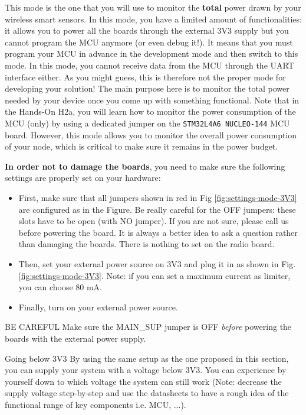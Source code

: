 This mode is the one that you will use to monitor the \textbf{total} power drawn by your wireless smart sensors. In this mode, you have a limited amount of functionalities: it allows you to power all the boards through the external 3V3 supply but you cannot program the MCU anymore (or even debug it!). It means that you must program your MCU in advance in the development mode and then switch to this mode. In this mode, you cannot receive data from the MCU through the UART interface either. As you might guess, this is therefore not the proper mode for developing your solution! The main purpose here is to monitor the total power needed by your device once you come up with something functional. Note that in the Hands-On H2a, you will learn how to monitor the power consumption of the MCU (only) by using a dedicated jumper on the \texttt{STM32L4A6 NUCLEO-144} MCU board. However, this mode allows you to monitor the overall power consumption of your node, which is critical to make sure it remains in the power budget.

\textbf{In order not to damage the boards}, you need to make sure the following settings are properly set on your hardware:

\begin{itemize}
    \item First, make sure that all jumpers shown in red in Fig \ref{fig:settings-mode-3V3} are configured as in the Figure.
    Be really careful for the OFF jumpers: these slots have to be open (with NO jumper). If you are not sure, please call us before powering the board. It is always a better idea to ask a question rather than damaging the boards. There is nothing to set on the radio board.
    \item Then, set your external power source on 3V3 and plug it in as shown in Fig. \ref{fig:settings-mode-3V3}. Note: if you can set a maximum current as limiter, you can choose 80 mA.
    \item Finally, turn on your external power source.
\end{itemize}

\begin{bclogo}[couleur = gray!20, arrondi = 0.2, logo=\bcattention]{BE CAREFUL}
Make sure the MAIN\_SUP jumper is OFF \textit{before} powering the boards with the external power supply.
\end{bclogo}

\begin{bclogo}[couleur = gray!20, arrondi = 0.2, logo=\bcinfo]{Going below 3V3}
By using the same setup as the one proposed in this section, you can supply your system with a voltage below 3V3. You can experience by yourself down to which voltage the system can still work (Note: decrease the supply voltage step-by-step and use the datasheets to have a rough idea of the functional range of key components i.e. MCU, ...).
\end{bclogo}

